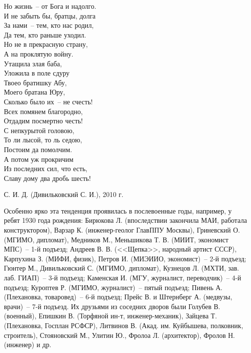 \begin{small}
\begin{multicols}{2}
    \vfill
    \noindent
    Но жизнь~-- от Бога и надолго.\\
    И не забыть бы, братцы, долга\\
    За нами~-- тем, кто нас родил,\\
    Да тем, кто раньше уходил.\\
    Но не в прекрасную страну,\\
    А на проклятую войну.\\
    \vfill
    \noindent
    Утащила злая баба,\\
    Уложила в поле сдуру\\
    Твоео братишку Абу,\\
    Моего братана Юру,\\
    Сколько было их~-- не счесть!\\
    Всех помянем благородно,\\
    Отдадим посмертно честь!\\
    \vfill
    \noindent
    С непкурытой головою,\\
    То ли лысой, то ль седою,\\
    Постоим да помолчим.\\
    А потом уж прокричим\\
    Из последних сил, что есть,\\
    Славу дому два дробь шесть!\\



\end{multicols}


{\raggedleft С. И. Д. (Дивильковский С. И.), 2010 г. 

}
\end{small}
\vspace*{-5mm}


\restoregeometry

Особенно ярко эта тенденция проявилась в послевоенные годы, например, у ребят 1930 года рождения: Бирюкова Л. (впоследствии закончила МАИ, работала конструктором), Варзар К. (инженер-геолог ГлавППУ Москвы), Гриневский О. (МГИМО, дипломат), Медников М., Меньшикова Т. В. (МИИТ, экономист МПС)~-- 1-й подъезд; Андреев В. В. (<<Щепка>>, народный артист СССР), Карпухина З. (МИФИ, физик), Петров И. (МИЭИИО, экономист)~-- 2-й подъезд; Гюнтер М., Дивильковский С. (МГИМО, дипломат), Кузнецов Л. (МХТИ, зав. лаб. ГИАП)~-- 3-й подъезд; Каменская И. (МГУ, журналист, переводчик)~-- 4-й подъезд; Куроптев Р. (МГИМО, журналист)~-- пятый подъезд; Пивень А. (Плехановка, товаровед)~-- 6-й подъезд; Прейс В. и Штернберг А. (медвузы, врачи)~-- 7-й подъезд. Их друзьями из соседних дворов были Голубев В. (военный), Епишкин В. (Торфяной ин-т, инженер-механик), Зайцева Т. (Плехановка, Госплан РСФСР), Литвинов В. (Акад. им. Куйбышева, полковник, строитель), Стояновский М., Улитин Ю., Фролоа Л. (архитектор), Фролов Н. (инженер) и др.

